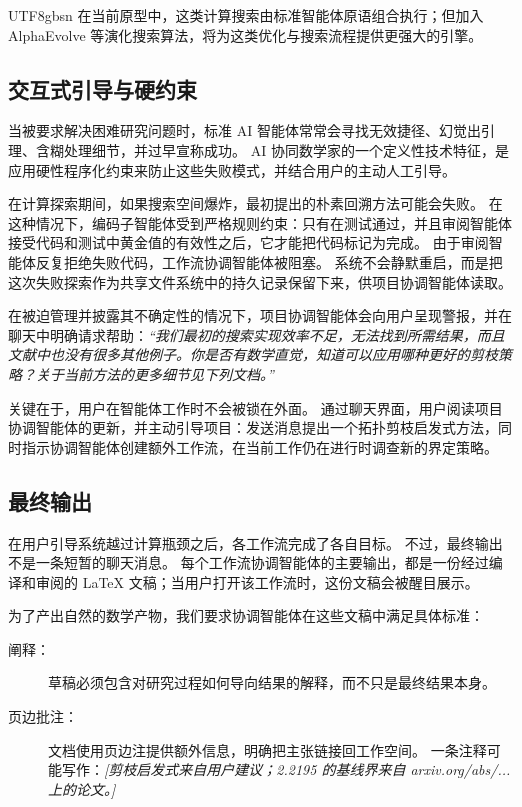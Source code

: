 \documentclass[11pt, a4paper, copyright, gdm]{google}
\newcommand{\user}[1]{\emph{#1}}
\begin{document}
\begin{CJK*}{UTF8}{gbsn}
在当前原型中，这类计算搜索由标准智能体原语组合执行；但加入 AlphaEvolve 等演化搜索算法，将为这类优化与搜索流程提供更强大的引擎。

\subsection{交互式引导与硬约束}

当被要求解决困难研究问题时，标准 AI 智能体常常会寻找无效捷径、幻觉出引理、含糊处理细节，并过早宣称成功。
AI 协同数学家的一个定义性技术特征，是应用硬性程序化约束来防止这些失败模式，并结合用户的主动人工引导。

在计算探索期间，如果搜索空间爆炸，最初提出的朴素回溯方法可能会失败。
在这种情况下，编码子智能体受到严格规则约束：只有在测试通过，并且审阅智能体接受代码和测试中黄金值的有效性之后，它才能把代码标记为完成。
由于审阅智能体反复拒绝失败代码，工作流协调智能体被阻塞。
系统不会静默重启，而是把这次失败探索作为共享文件系统中的持久记录保留下来，供项目协调智能体读取。

在被迫管理并披露其不确定性的情况下，项目协调智能体会向用户呈现警报，并在聊天中明确请求帮助：\user{“我们最初的搜索实现效率不足，无法找到所需结果，而且文献中也没有很多其他例子。你是否有数学直觉，知道可以应用哪种更好的剪枝策略？关于当前方法的更多细节见下列文档。”}

关键在于，用户在智能体工作时不会被锁在外面。
通过聊天界面，用户阅读项目协调智能体的更新，并主动引导项目：发送消息提出一个拓扑剪枝启发式方法，同时指示协调智能体创建额外工作流，在当前工作仍在进行时调查新的界定策略。

\subsection{最终输出}

在用户引导系统越过计算瓶颈之后，各工作流完成了各自目标。
不过，最终输出不是一条短暂的聊天消息。
%
每个工作流协调智能体的主要输出，都是一份经过编译和审阅的 LaTeX 文稿；当用户打开该工作流时，这份文稿会被醒目展示。

为了产出自然的数学产物，我们要求协调智能体在这些文稿中满足具体标准：

\begin{description}
\item[阐释：] 草稿必须包含对研究过程如何导向结果的解释，而不只是最终结果本身。

\item[页边批注：] 文档使用页边注提供额外信息，明确把主张链接回工作空间。
一条注释可能写作：\user{[剪枝启发式来自用户建议；2.2195 的基线界来自 arxiv.org/abs/... 上的论文。]}


\end{description}
\end{CJK*}
\end{document}
